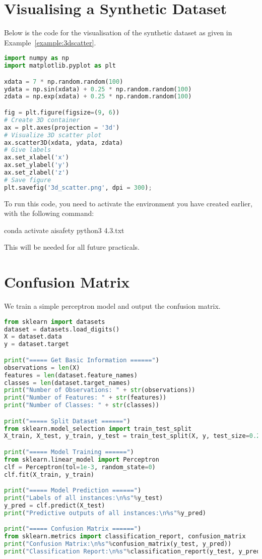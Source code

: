 \section{Visualising a Synthetic Dataset}

Below is the code for the visualisation of the synthetic dataset as given in Example~\ref{example:3dscatter}. 

\begin{lstlisting}[language=Python]
import numpy as np
import matplotlib.pyplot as plt

xdata = 7 * np.random.random(100)
ydata = np.sin(xdata) + 0.25 * np.random.random(100)
zdata = np.exp(xdata) + 0.25 * np.random.random(100)

fig = plt.figure(figsize=(9, 6))
# Create 3D container
ax = plt.axes(projection = '3d')
# Visualize 3D scatter plot
ax.scatter3D(xdata, ydata, zdata)
# Give labels
ax.set_xlabel('x')
ax.set_ylabel('y')
ax.set_zlabel('z')
# Save figure
plt.savefig('3d_scatter.png', dpi = 300);
\end{lstlisting}

To run this code,
you need to activate the environment you have created earlier, with the following command: 
\begin{cmds}
conda activate aisafety
python3 4.3.txt
\end{cmds}
This will be needed for all future practicals. 



\section{Confusion Matrix}

We train a simple perceptron model and output the confusion matrix. 

\begin{lstlisting}[language=Python]
from sklearn import datasets
dataset = datasets.load_digits()
X = dataset.data
y = dataset.target

print("===== Get Basic Information ======")
observations = len(X)
features = len(dataset.feature_names)
classes = len(dataset.target_names)
print("Number of Observations: " + str(observations))
print("Number of Features: " + str(features))
print("Number of Classes: " + str(classes))

print("===== Split Dataset ======")
from sklearn.model_selection import train_test_split
X_train, X_test, y_train, y_test = train_test_split(X, y, test_size=0.20)

print("===== Model Training ======")
from sklearn.linear_model import Perceptron
clf = Perceptron(tol=1e-3, random_state=0)
clf.fit(X_train, y_train)

print("===== Model Prediction ======")
print("Labels of all instances:\n%s"%y_test)
y_pred = clf.predict(X_test)
print("Predictive outputs of all instances:\n%s"%y_pred)

print("===== Confusion Matrix ======")
from sklearn.metrics import classification_report, confusion_matrix
print("Confusion Matrix:\n%s"%confusion_matrix(y_test, y_pred))
print("Classification Report:\n%s"%classification_report(y_test, y_pred))
\end{lstlisting}